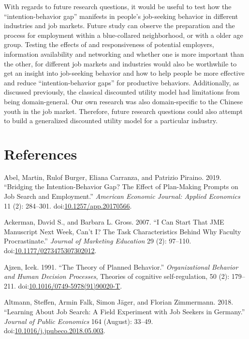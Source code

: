 \documentclass[]{elsarticle} %
\begin{document}
With regards to future research questions, it would be useful to test
how the ``intention-behavior gap'' manifests in people's job-seeking
behavior in different industries and job markets. Future study can
observe the preparation and the process for employment within a
blue-collared neighborhood, or with a older age group. Testing the
effects of and responsiveness of potential employers, information
availability and networking and whether one is more important than the
other, for different job markets and industries would also be worthwhile
to get an insight into job-seeking behavior and how to help people be
more effective and reduce ``intention-behavior gaps'' for productive
behaviors. Additionally, as discussed previously, the classical
discounted utility model had limitations from being domain-general. Our
own research was also domain-specific to the Chinese youth in the job
market. Therefore, future research questions could also attempt to build
a generalized discounted utility model for a particular industry.

\section*{References}\label{references}

\hypertarget{refs}{}
\hypertarget{ref-abel_bridging_2019}{}
Abel, Martin, Rulof Burger, Eliana Carranza, and Patrizio Piraino. 2019.
``Bridging the Intention-Behavior Gap? The Effect of Plan-Making Prompts
on Job Search and Employment.'' \emph{American Economic Journal: Applied
Economics} 11 (2): 284--301.
doi:\href{https://doi.org/10.1257/app.20170566}{10.1257/app.20170566}.

\hypertarget{ref-ackerman_i_2007}{}
Ackerman, David S., and Barbara L. Gross. 2007. ``I Can Start That JME
Manuscript Next Week, Can't I? The Task Characteristics Behind Why
Faculty Procrastinate.'' \emph{Journal of Marketing Education} 29 (2):
97--110.
doi:\href{https://doi.org/10.1177/0273475307302012}{10.1177/0273475307302012}.

\hypertarget{ref-ajzen_theory_1991}{}
Ajzen, Icek. 1991. ``The Theory of Planned Behavior.''
\emph{Organizational Behavior and Human Decision Processes}, Theories of
cognitive self-regulation, 50 (2): 179--211.
doi:\href{https://doi.org/10.1016/0749-5978(91)90020-T}{10.1016/0749-5978(91)90020-T}.

\hypertarget{ref-altmann_learning_2018}{}
Altmann, Steffen, Armin Falk, Simon Jäger, and Florian Zimmermann. 2018.
``Learning About Job Search: A Field Experiment with Job Seekers in
Germany.'' \emph{Journal of Public Economics} 164 (August): 33--49.
doi:\href{https://doi.org/10.1016/j.jpubeco.2018.05.003}{10.1016/j.jpubeco.2018.05.003}.
\end{document}
